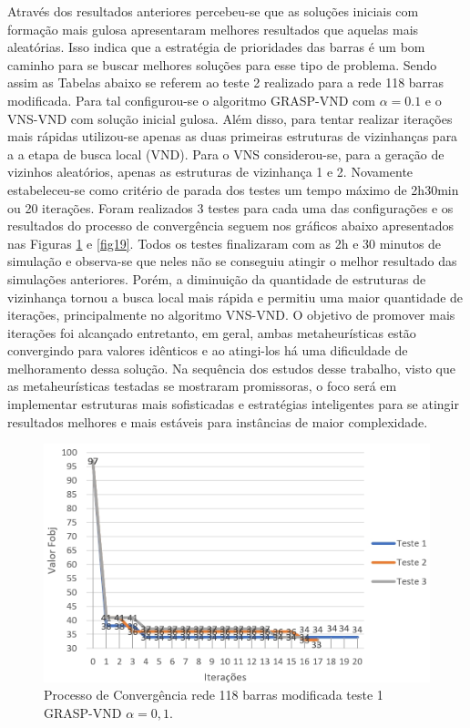 \documentclass[12pt]{article}
\begin{document}
Através dos resultados anteriores percebeu-se que as soluções iniciais com formação mais gulosa apresentaram melhores resultados que aquelas mais aleatórias. Isso indica que a estratégia de prioridades das barras é um bom caminho para se buscar melhores soluções para esse tipo de problema. Sendo assim as Tabelas abaixo se referem ao teste 2 realizado para a rede 118 barras modificada. Para tal configurou-se o algoritmo GRASP-VND com $\alpha=0.1$ e o VNS-VND com solução inicial gulosa. Além disso, para tentar realizar iterações mais rápidas utilizou-se apenas as duas primeiras estruturas de vizinhanças para a a etapa de busca local (VND). Para o VNS considerou-se, para a geração de vizinhos aleatórios, apenas as estruturas de vizinhança 1 e 2. Novamente estabeleceu-se como critério de parada dos testes um tempo máximo de 2h30min ou 20 iterações. Foram realizados 3 testes para cada uma das configurações e os resultados do processo de convergência seguem nos gráficos abaixo apresentados nas Figuras \ref{fig18} e \ref{fig19}. Todos os testes finalizaram com as 2h e 30 minutos de simulação e observa-se que neles não se conseguiu atingir o melhor resultado das simulações anteriores. Porém, a diminuição da quantidade de estruturas de vizinhança tornou a busca local mais rápida e permitiu uma maior quantidade de iterações, principalmente no algoritmo VNS-VND. O objetivo de promover mais iterações foi alcançado entretanto, em geral, ambas metaheurísticas estão convergindo para valores idênticos e ao atingi-los há uma dificuldade de melhoramento dessa solução. Na sequência dos estudos desse trabalho, visto que as metaheurísticas testadas se mostraram promissoras, o foco será em implementar estruturas mais sofisticadas e estratégias inteligentes para se atingir resultados melhores e mais estáveis para instâncias de maior complexidade.

\begin{figure}[H]
	\centering 
	\includegraphics[scale=0.8]{figuras/GRASP_118_2_alpha01.jpg}
	\caption{Processo de Convergência rede 118 barras modificada teste 1 GRASP-VND $\alpha=0,1$.}
	\label{fig18} %
\end{figure}
\end{document}
